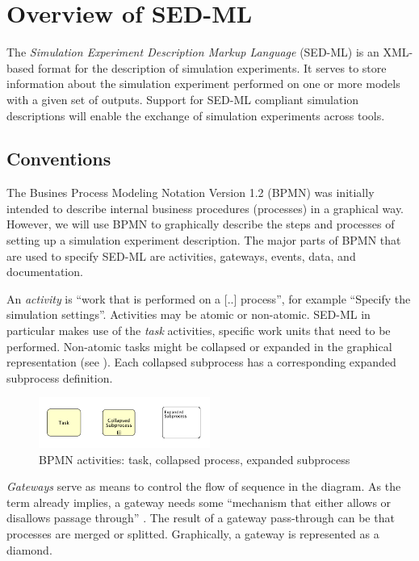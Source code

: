 \section{Overview of SED-ML}
\label{sec:overview}
The \emph{Simulation Experiment Description Markup Language} (SED-ML) is an XML-based format for the description of simulation experiments. It serves to store information about the simulation experiment performed on one or more models with a given set of outputs. Support for SED-ML compliant simulation descriptions will enable the exchange of simulation experiments across tools.
\subsection{Conventions}
%
The Busines Process Modeling Notation Version 1.2 (BPMN) was initially intended to describe internal business procedures (processes) in a graphical way. However, we will use BPMN to graphically describe the steps and processes of setting up a simulation experiment description. The major parts of BPMN that are used to specify SED-ML are activities, gateways, events, data, and documentation. 

An \emph{activity} is ``work that is performed on a [..] process'', for example ``Specify the simulation settings''. Activities may be atomic or non-atomic. SED-ML in particular makes use of the \emph{task} activities, \ie specific work units that need to be performed. Non-atomic tasks might be collapsed or expanded in the graphical representation (see ). Each collapsed subprocess has a corresponding expanded subprocess definition.

\begin{figure}[h]
\centering
\includegraphics[width=0.5\textwidth]{images/processes.pdf}
\caption{BPMN activities: task, collapsed process, expanded subprocess}
\label{fig:task}
\end{figure}

\emph{Gateways} serve as means to control the flow of sequence in the diagram. As the term already implies, a gateway needs some ``mechanism that either allows or disallows passage through'' \citep{White:2004}. The result of a gateway pass-through can be that processes are merged or splitted. Graphically, a gateway is represented as a diamond. 

